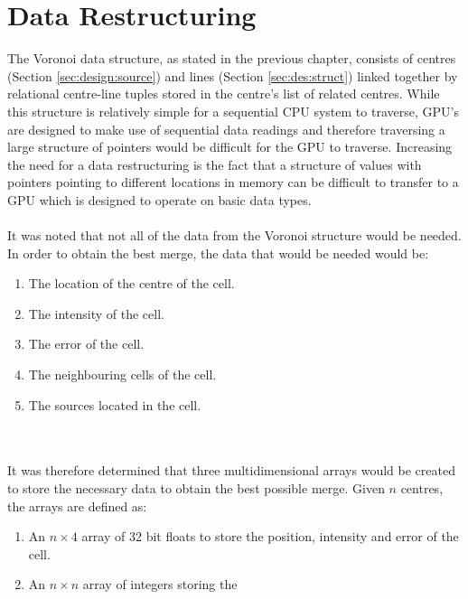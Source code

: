 \section{Data Restructuring}
The Voronoi data structure, as stated in the previous chapter, consists of centres (Section \ref{sec:design:source}) and lines (Section \ref{sec:des:struct}) linked together by relational centre-line tuples stored in the centre's  list of related centres. While this structure is relatively simple for a sequential CPU system to traverse, GPU's are designed to make use of sequential data readings and therefore traversing a large structure of pointers would be difficult for the GPU to traverse. Increasing the need for a data restructuring is the fact that a structure of values with pointers pointing to different locations in memory can be difficult to transfer to a GPU which is designed to operate on basic data types.
\\
\\
It was noted that not all of the data from the Voronoi structure would be needed. In order to obtain the best merge, the data that would be needed would be:
\begin{enumerate}
\item The location of the centre of the cell.
\item The intensity of the cell.
\item The error of the cell.
\item The neighbouring cells of the cell.
\item The sources located in the cell.
\end{enumerate}
\\
\\
It was therefore determined that three multidimensional arrays would be created to store the necessary data to obtain the best possible merge. Given $n$ centres, the arrays are defined as:
\begin{enumerate}
\item An $n\times4$ array of 32 bit floats to store the position, intensity and error of the cell.
\item An $n \times n$ array of integers storing the
\end{enumerate}